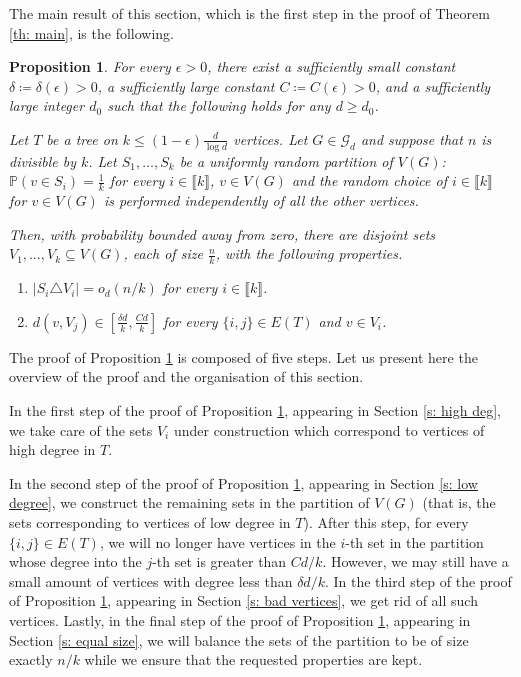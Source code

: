 \documentclass[notitlepage]{scrartcl}
\newcommand{\br}[1]{\llbracket{#1}\rrbracket}
\newtheorem{proposition}[thm]{Proposition}
\begin{document}
The main result of this section, which is the first step in the proof of Theorem \ref{th: main}, is the following.
\begin{proposition}\label{prop: main path}
For every $\epsilon > 0$, there exist a sufficiently small constant $\delta\coloneqq \delta(\epsilon)>0$, a sufficiently large constant $C\coloneqq C(\epsilon)>0$, and a sufficiently large integer $d_0$ such that the following holds for any $d\ge d_0$. 

Let $T$ be a tree on $k \le (1-\epsilon) \frac{d}{\log d}$ vertices. Let $G\in \mathcal{G}_d$ and suppose that $n$ is divisible by $k$. Let $S_1,\ldots, S_k$ be a uniformly random partition of $V(G)$: $\mathbb{P}\left(v\in S_i\right)= \frac{1}{k}$ for every $i\in \br{k}$, $v\in V(G)$ and the random choice of $i\in\br{k}$ for $v\in V(G)$ is performed independently of all the other vertices.

Then, with probability bounded away from zero, there are disjoint sets $V_1,\ldots, V_k\subseteq V(G)$, each of size $\frac{n}{k}$, with the following properties.
\begin{enumerate}[(P\arabic*{})]
    \item $|S_i\triangle V_i|=o_d(n/k)$ for every $i\in \br{k}$. \label{p: close to uniform}
    \item $d(v,V_j)\in \left[\frac{\delta d}{k},\frac{Cd}{k}\right]$ for every $\{i, j\} \in E(T)$ and $v \in V_i$. \label{p: good degree between}
\end{enumerate}
\end{proposition}

The proof of Proposition \ref{prop: main path} is composed of five steps. Let us present here the overview of the proof and the organisation of this section.

In the first step of the proof of Proposition \ref{prop: main path}, appearing in Section \ref{s: high deg}, we take care of the sets $V_i$ under construction which correspond to vertices of high degree in $T$.

In the second step of the proof of Proposition \ref{prop: main path}, appearing in Section \ref{s: low degree}, we construct the remaining sets in the partition of $V(G)$ (that is, the sets corresponding to vertices of low degree in $T$). After this step, for every $\{i, j\} \in E(T)$, we will no longer have vertices in the $i$-th set in the partition whose degree into the $j$-th set is greater than $Cd/k$. However, we may still have a small amount of vertices with degree less than $\delta d/k$. In the third step of the proof of Proposition \ref{prop: main path}, appearing in Section \ref{s: bad vertices}, we get rid of all such vertices. Lastly, in the final step of the proof of Proposition \ref{prop: main path}, appearing in Section \ref{s: equal size}, we will balance the sets of the partition to be of size exactly $n/k$ while we ensure that the requested properties are kept. 
\end{document}
